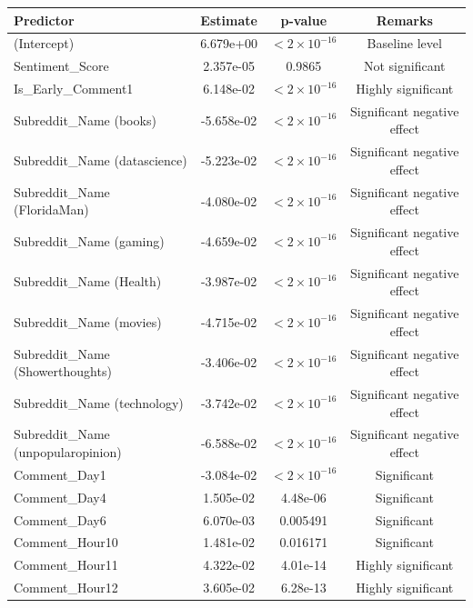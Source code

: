 \documentclass[10pt]{article}
\begin{document}
\begin{table}[H]
\centering
\small
\begin{tabular}{lccc}
\toprule
\textbf{Predictor} & \textbf{Estimate} & \textbf{p-value} & \textbf{Remarks} \\
\midrule
(Intercept)                     & 6.679e+00 & $<2\times10^{-16}$ & Baseline level \\
Sentiment\_Score                 & 2.357e-05 & 0.9865    & Not significant \\
Is\_Early\_Comment1              & 6.148e-02 & $<2\times10^{-16}$ & Highly significant \\
Subreddit\_Name (books)          & -5.658e-02 & $<2\times10^{-16}$ & Significant negative effect \\
Subreddit\_Name (datascience)    & -5.223e-02 & $<2\times10^{-16}$ & Significant negative effect \\
Subreddit\_Name (FloridaMan)     & -4.080e-02 & $<2\times10^{-16}$ & Significant negative effect \\
Subreddit\_Name (gaming)         & -4.659e-02 & $<2\times10^{-16}$ & Significant negative effect \\
Subreddit\_Name (Health)         & -3.987e-02 & $<2\times10^{-16}$ & Significant negative effect \\
Subreddit\_Name (movies)         & -4.715e-02 & $<2\times10^{-16}$ & Significant negative effect \\
Subreddit\_Name (Showerthoughts) & -3.406e-02 & $<2\times10^{-16}$ & Significant negative effect \\
Subreddit\_Name (technology)     & -3.742e-02 & $<2\times10^{-16}$ & Significant negative effect \\
Subreddit\_Name (unpopularopinion)& -6.588e-02 & $<2\times10^{-16}$ & Significant negative effect \\
Comment\_Day1                    & -3.084e-02 & $<2\times10^{-16}$ & Significant \\
Comment\_Day4                    & 1.505e-02  & 4.48e-06  & Significant \\
Comment\_Day6                    & 6.070e-03  & 0.005491  & Significant \\
Comment\_Hour10                  & 1.481e-02  & 0.016171  & Significant \\
Comment\_Hour11                  & 4.322e-02  & 4.01e-14  & Highly significant \\
Comment\_Hour12                  & 3.605e-02  & 6.28e-13  & Highly significant \\

\end{tabular}
\end{table}
\end{document}
